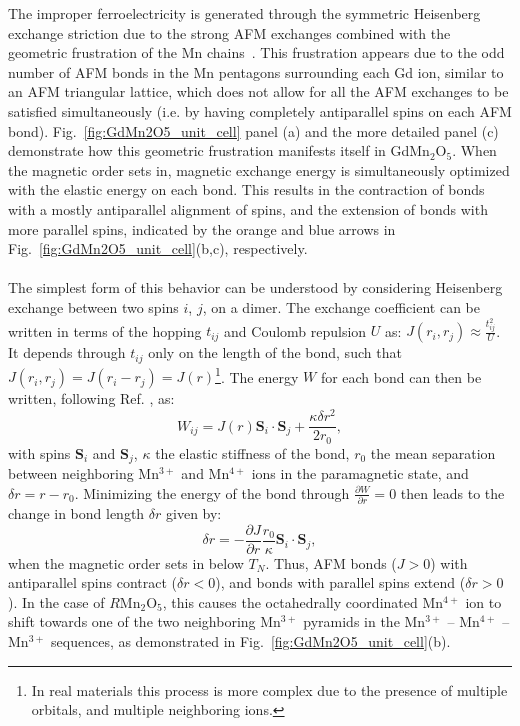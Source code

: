 The improper ferroelectricity is generated through the symmetric Heisenberg exchange striction due to the strong AFM exchanges combined with the geometric frustration of the Mn chains~\cite{Choi2008}.
This frustration appears due to the odd number of AFM bonds in the Mn pentagons surrounding each Gd ion, similar to an AFM triangular lattice, which does not allow for all the AFM exchanges to be satisfied simultaneously (i.e. by having completely antiparallel spins on each AFM bond).
Fig.~\ref{fig:GdMn2O5_unit_cell} panel (a) and the more detailed panel (c) demonstrate how this geometric frustration manifests itself in GdMn$_2$O$_5$.
When the magnetic order sets in, magnetic exchange energy is simultaneously optimized with the elastic energy on each bond.
This results in the contraction of bonds with a mostly antiparallel alignment of spins, and the extension of bonds with more parallel spins, indicated by the orange and blue arrows in Fig.~\ref{fig:GdMn2O5_unit_cell}(b,c), respectively.
\\\\
The simplest form of this behavior can be understood by considering Heisenberg exchange between two spins $i$, $j$, on a dimer.
The exchange coefficient can be written in terms of the hopping $t_{ij}$ and Coulomb repulsion $U$ as: $J(r_i, r_j)\approx \frac{t_{ij}^2}{U}$.
It depends through $t_{ij}$ only on the length of the bond, such that $J(r_i, r_j) = J(r_i - r_j) = J(r)$\footnote{In real materials this process is more complex due to the presence of multiple orbitals, and multiple neighboring ions.}.
The energy $W$ for each bond can then be written, following Ref. \cite{Harris1972}, as:
\begin{equation}
	W_{ij} = J(r)\bm{S}_i \cdot \bm{S}_j + \frac{\kappa \delta r^2}{2r_0},
\end{equation}
with spins $\bm{S}_i$ and $\bm{S}_j$, $\kappa$ the elastic stiffness of the bond, $r_0$ the mean separation between neighboring Mn$^{3+}$ and Mn$^{4+}$ ions in the paramagnetic state, and $\delta r = r - r_0$.
Minimizing the energy of the bond through $\frac{\partial W}{\partial r} = 0$ then leads to the change in bond length $\delta r$ given by:
\begin{equation}
	\delta r = -\frac{\partial J}{\partial r}\frac{r_0}{\kappa}\bm{S}_i \cdot \bm{S}_j,
\end{equation}
when the magnetic order sets in below $T_N$. Thus, AFM bonds ($J > 0$) with antiparallel spins contract ($\delta r < 0$), and bonds with parallel spins extend ($\delta r > 0$).
In the case of $R$Mn$_2$O$_5$, this causes the octahedrally coordinated Mn$^{4+}$ ion to shift towards one of the two neighboring Mn$^{3+}$ pyramids in the Mn$^{3+}$ -- Mn$^{4+}$ -- Mn$^{3+}$ sequences, as demonstrated in Fig.~\ref{fig:GdMn2O5_unit_cell}(b).

